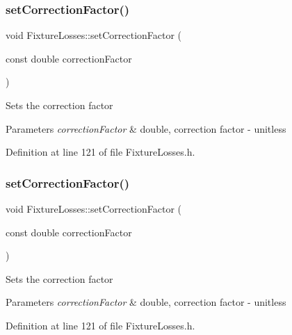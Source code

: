 \subsubsection{\texorpdfstring{set\+Correction\+Factor()}{setCorrectionFactor()}\hspace{0.1cm}{\footnotesize\ttfamily [2/3]}}
{\footnotesize\ttfamily void Fixture\+Losses\+::set\+Correction\+Factor (\begin{DoxyParamCaption}\item[{const double}]{correction\+Factor }\end{DoxyParamCaption})\hspace{0.3cm}{\ttfamily [inline]}}

Sets the correction factor 
\begin{DoxyParams}{Parameters}
{\em correction\+Factor} & double, correction factor -\/ unitless \\
\hline
\end{DoxyParams}


Definition at line 121 of file Fixture\+Losses.\+h.

\mbox{\label{class_fixture_losses_a3a3dd839d71adb630e7ce76644f18098}} 
\subsubsection{\texorpdfstring{set\+Correction\+Factor()}{setCorrectionFactor()}\hspace{0.1cm}{\footnotesize\ttfamily [3/3]}}
{\footnotesize\ttfamily void Fixture\+Losses\+::set\+Correction\+Factor (\begin{DoxyParamCaption}\item[{const double}]{correction\+Factor }\end{DoxyParamCaption})\hspace{0.3cm}{\ttfamily [inline]}}

Sets the correction factor 
\begin{DoxyParams}{Parameters}
{\em correction\+Factor} & double, correction factor -\/ unitless \\
\hline
\end{DoxyParams}


Definition at line 121 of file Fixture\+Losses.\+h.

\mbox{\label{class_fixture_losses_a6543643db6b28f3a78397c97d9c5135f}} 

